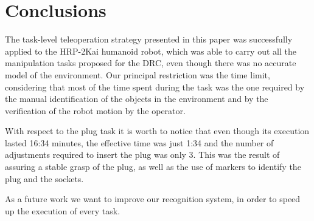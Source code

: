 \section{Conclusions}
	\label{sec:conclusions}
	
	The task-level teleoperation strategy presented in this paper was successfully applied
	to the HRP-2Kai humanoid robot, which was able to carry out all the manipulation tasks
	proposed for the DRC, even though there was no accurate model of the environment.
	Our principal restriction was the time limit, considering that most of the time spent
	during the task was the one required by the manual identification of the objects in the
	environment and by the verification of the robot motion by the operator.
	
	With respect to the plug task it is worth to notice that even though its execution
	lasted 16:34 minutes, the effective time was just 1:34 and the number of adjustments
	required to insert the plug was only 3.
	This was the result of assuring a stable grasp of the plug, as well as the use of markers
	to identify the plug and the sockets.
	
	As a future work we want to improve our recognition system, in order to speed up the execution
	of every task.